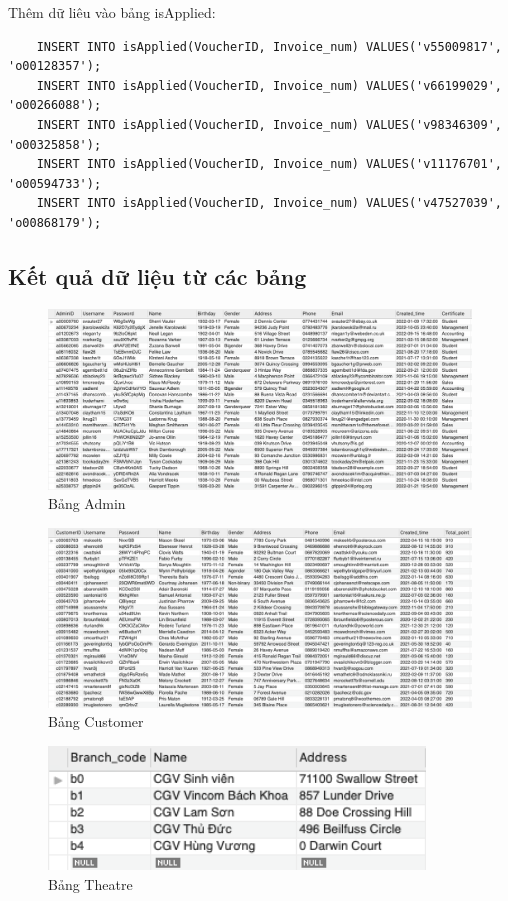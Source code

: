 Thêm dữ liêu vào bảng isApplied:
\begin{verbatim}
    INSERT INTO isApplied(VoucherID, Invoice_num) VALUES('v55009817', 'o00128357');
    INSERT INTO isApplied(VoucherID, Invoice_num) VALUES('v66199029', 'o00266088');
    INSERT INTO isApplied(VoucherID, Invoice_num) VALUES('v98346309', 'o00325858');
    INSERT INTO isApplied(VoucherID, Invoice_num) VALUES('v11176701', 'o00594733');
    INSERT INTO isApplied(VoucherID, Invoice_num) VALUES('v47527039', 'o00868179');
\end{verbatim}

\subsection{Kết quả dữ liệu từ các bảng}
\begin{figure}[H]
    \centering
    \includegraphics[width=\textwidth]{images/ADMIN.png}
    \caption{Bảng Admin}
\end{figure}

\begin{figure}[H]
    \centering
    \includegraphics[width=\textwidth]{images/CUSTOMER.png}
    \caption{Bảng Customer}
\end{figure}

\begin{figure}[H]
    \centering
    \includegraphics[width=10cm]{images/THATRE.png}
    \caption{Bảng Theatre}
\end{figure}

